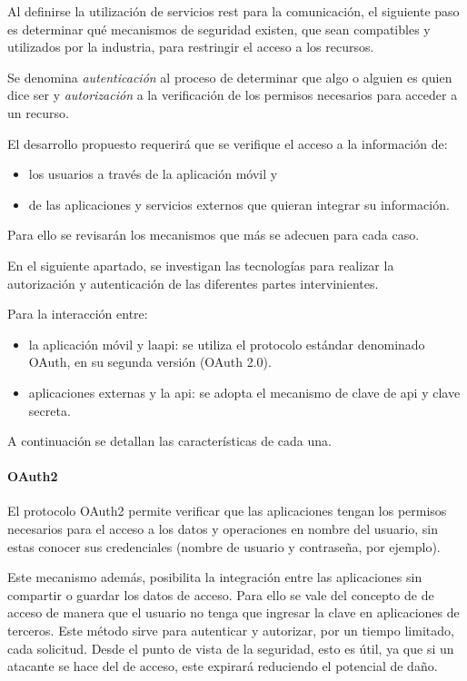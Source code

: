 Al definirse la utilización de servicios \gls{rest} para la comunicación, el siguiente paso es determinar qué mecanismos de seguridad existen, que sean compatibles y utilizados por la industria, para restringir el acceso a los recursos.

Se denomina \textit{autenticación} al proceso de determinar que algo o alguien es quien dice ser y \textit{autorización} a la verificación de los permisos necesarios para acceder a un recurso\cite{authAuth}.

El desarrollo propuesto requerirá que se verifique el acceso a la información de:
\begin{itemize}
\item los usuarios a través de la aplicación  móvil y 
\item de las aplicaciones y servicios externos que quieran integrar su información.
\end{itemize}
Para ello se revisarán los mecanismos que más se adecuen para cada caso.

En el siguiente apartado, se investigan las tecnologías para realizar la autorización y autenticación de las diferentes partes intervinientes. 

Para la interacción entre:
\begin{itemize}
\item la aplicación móvil y la\gls{api}: se utiliza el protocolo estándar denominado OAuth, en su segunda versión (OAuth 2.0).
\item aplicaciones externas y la \gls{api}: se adopta el mecanismo de clave de \gls{api} y clave secreta.
\end{itemize}
A continuación se detallan las características de cada una.

\paragraph{OAuth2}
\label{oauth}

El protocolo OAuth2 permite verificar que las aplicaciones tengan los permisos necesarios para el acceso a los datos y operaciones en nombre del usuario, sin estas conocer sus credenciales (nombre de usuario y contraseña, por ejemplo)\cite{hardt2012oauth}.

Este mecanismo además, posibilita la integración entre las aplicaciones sin compartir o guardar los datos de acceso. Para ello se vale del concepto de  de acceso de manera que el usuario no tenga que ingresar la clave en aplicaciones de terceros. Este método sirve para autenticar y autorizar, por un tiempo limitado, cada solicitud. Desde el punto de vista de la seguridad, esto es útil, ya que si un atacante se hace del  de acceso, este expirará reduciendo el potencial de daño.

